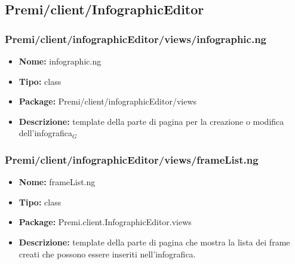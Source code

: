 \clearpage
\subsection{Premi/client/InfographicEditor}

\subsubsection{Premi/client/infographicEditor/views/infographic.ng}
\begin{itemize}
  \item[] \textbf{Nome:} infographic.ng
  \item[] \textbf{Tipo:} class
  \item[] \textbf{Package:} Premi/client/infographicEditor/views
  \item[] \textbf{Descrizione:}  template della parte di pagina per la creazione o modifica dell'infografica$_G$
\end{itemize}
\subsubsection{Premi/client/infographicEditor/views/frameList.ng}
\begin{itemize}
  \item[] \textbf{Nome:} frameList.ng
  \item[] \textbf{Tipo:} class
  \item[] \textbf{Package:} Premi.client.InfographicEditor.views
  \item[] \textbf{Descrizione:} template della parte di pagina che mostra la lista dei frame creati che possono essere inseriti nell'infografica.
\end{itemize}
